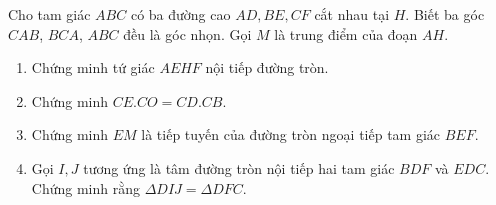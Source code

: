 \begin{ex}%
	Cho tam giác $ABC$ có ba đường cao $AD,BE,CF$ cắt nhau tại $H.$ Biết ba góc $CAB$, $BCA$, $ABC$ đều là góc nhọn. Gọi $M$ là trung điểm của đoạn $AH.$
	\begin{enumerate}
		\item Chứng minh tứ giác $AEHF$ nội tiếp đường tròn.
		\item Chứng minh $CE.CO=CD.CB.$
		\item Chứng minh $EM$ là tiếp tuyến của đường tròn ngoại tiếp tam giác $BEF.$
		\item Gọi $I,J$ tương ứng là tâm đường tròn nội tiếp hai tam giác $BDF$ và $EDC.$ Chứng minh rằng $\Delta DIJ=\Delta DFC.$	\end{enumerate}
	\loigiai{
	
}
\end{ex}
